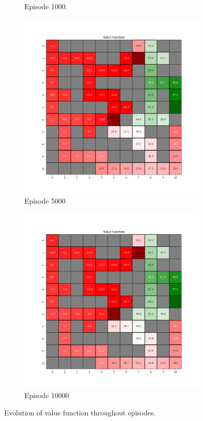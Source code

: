\documentclass{assignment}
\begin{document}
\begin{figure}[H]
\begin{subfigure}{0.3\textwidth}
    \caption{Episode 1000.}
    \end{subfigure}\hfill
    \begin{subfigure}{0.3\textwidth}
        \includegraphics[width=\textwidth]{figures/value_q/epsilon_sweep/value_function_alpha_0.1_gamma_0.95_epsilon_0.5_iteration_5000.png}
    \caption{Episode 5000}
    \end{subfigure}\hfill
    \begin{subfigure}{0.3\textwidth}
        \includegraphics[width=\textwidth]{figures/value_q/epsilon_sweep/value_function_alpha_0.1_gamma_0.95_epsilon_0.5_iteration_10000.png}
    \caption{Episode 10000}
    \end{subfigure}
    \caption{Evolution of value function throughout episodes.}
    \label{fig:epsilon_0.5_q_learning_value}
\end{figure}
\end{document}
